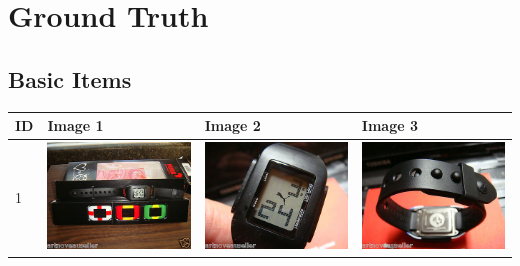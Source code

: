 \chapter{Ground Truth}
\section{Basic Items}
\begin{longtable}{| l | l | l | l |}
	\hline
	ID & Image 1 & Image 2 & Image 3 \\
	\hline
	\multirow{6}{*}{1} & \includegraphics[scale=0.25]{images/ground_truth/1/image_1} & \includegraphics[scale=0.25]{images/ground_truth/1/image_2} & \includegraphics[scale=0.25]{images/ground_truth/1/image_3} \\

\end{longtable}
